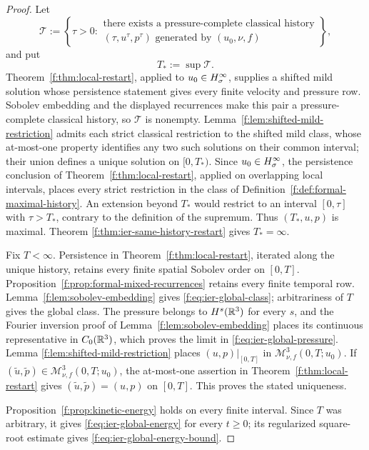 \begin{proof}
 Let
 \[
  \mathscr T:=\left\{\tau>0:
  \begin{array}{c}
  \text{there exists a pressure-complete classical history}\\
  (\tau,u^\tau,p^\tau)\text{ generated by }(u_0,\nu,f)
  \end{array}
  \right\},
 \]
 and put
\[
 T_*:=\sup\mathscr T.
\]
 Theorem~\ref{f:thm:local-restart}, applied to \(u_0\in H^\infty_\sigma\), supplies a
 shifted mild solution whose persistence statement gives every finite
 velocity and pressure row.  Sobolev embedding and the displayed recurrences
 make this pair a pressure-complete classical history, so \(\mathscr T\) is
 nonempty.
 Lemma~\ref{f:lem:shifted-mild-restriction} admits each strict classical
restriction to the shifted mild class, whose at-most-one property identifies
any two such solutions on their common interval; their union defines a unique
 solution on \([0,T_*)\).  Since \(u_0\in H^\infty_\sigma\), the persistence conclusion
of Theorem~\ref{f:thm:local-restart}, applied on overlapping local intervals,
places every strict restriction in the class of
Definition~\ref{f:def:formal-maximal-history}.  An extension beyond \(T_*\)
 would restrict to an interval \([0,\tau]\) with \(\tau>T_*\), contrary to
 the definition of the supremum.  Thus \((T_*,u,p)\) is maximal.  Theorem
\ref{f:thm:ier-same-history-restart} gives \(T_*=\infty\).

Fix \(T<\infty\).  Persistence in Theorem~\ref{f:thm:local-restart}, iterated
along the unique history, retains every finite spatial Sobolev order on
\([0,T]\).  Proposition~\ref{f:prop:formal-mixed-recurrences} retains every
finite temporal row.  Lemma~\ref{f:lem:sobolev-embedding} gives
\eqref{f:eq:ier-global-class}; arbitrariness of \(T\) gives the global class.
The pressure belongs to \(H^s(\mathbb R^3)\) for every \(s\), and the Fourier
inversion proof of Lemma~\ref{f:lem:sobolev-embedding} places its continuous
representative in \(C_0(\mathbb R^3)\), which proves the limit in
\eqref{f:eq:ier-global-pressure}.  Lemma
\ref{f:lem:shifted-mild-restriction} places \((u,p)|_{[0,T]}\) in
\(\mathscr M_{\nu,f}^3(0,T;u_0)\).  If
\((\widetilde u,\widetilde p)\in\mathscr M_{\nu,f}^3(0,T;u_0)\), the at-most-one
assertion in Theorem~\ref{f:thm:local-restart} gives
\((\widetilde u,\widetilde p)=(u,p)\) on \([0,T]\).  This proves the stated
uniqueness.

Proposition~\ref{f:prop:kinetic-energy} holds on every finite interval.  Since
\(T\) was arbitrary, it gives \eqref{f:eq:ier-global-energy} for every
\(t\ge0\); its regularized square-root estimate gives
\eqref{f:eq:ier-global-energy-bound}.
\end{proof}
